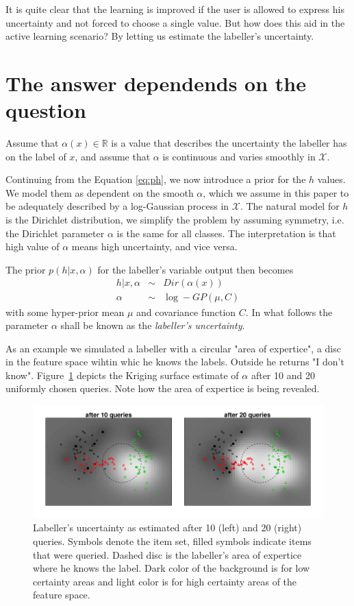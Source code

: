 \documentclass[10pt, onecolumn]{article}
\newcommand{\R}{\mathbb{R}}
\newcommand{\X}{\mathcal{X}}
\begin{document}
It is quite clear that the learning is improved if the user is allowed to express his uncertainty and not forced to choose a single value. But how does this aid in the active learning scenario? By letting us estimate the labeller's uncertainty.


\section{The answer dependends on the question}
Assume that $\alpha(x)\in \R$ is a value that describes the uncertainty the labeller has on the label of $x$, and assume that $\alpha$ is continuous and varies smoothly in $\X$.

Continuing from the Equation \ref{eq:ph}, we now introduce a prior for the $h$ values. We model them as dependent on the smooth $\alpha$, which we assume in this paper to be adequately described by a log-Gaussian process in $\X$. The natural model for $h$ is the Dirichlet distribution, we simplify the problem by assuming symmetry, i.e. the Dirichlet parameter $\alpha$ is the same for all classes. The interpretation is that high value of $\alpha$ means high uncertainty, and vice versa. 

The prior $p(h|x,\alpha)$ for the labeller's variable output then becomes
\begin{eqnarray}
h | x, \alpha &\sim& Dir(\alpha(x))\\
\alpha &\sim & \log - GP(\mu, C)
\end{eqnarray}
with some hyper-prior mean $\mu$ and covariance function $C$. In what follows the parameter $\alpha$ shall be known as the \emph{labeller's uncertainty}. 


As an example we simulated a labeller with a circular "area of expertice", a disc in the feature space wihtin whic he knows the labels. Outside he returns "I don't know". Figure~\ref{fig:est_alpha1} depicts the Kriging surface estimate of $\alpha$ after 10 and 20 uniformly chosen queries. Note how the area of expertice is being revealed.

\begin{figure}[hbtp]
\centering
\includegraphics[width=6in]{figures/estimated_alpha.pdf}
\caption{Labeller's uncertainty as estimated after 10 (left) and 20 (right) queries. Symbols denote the item set, filled symbols indicate items that were queried. Dashed disc is the labeller's area of expertice where he knows the label. Dark color of the background is for low certainty areas and light color is for high certainty areas of the feature space.}
\label{fig:est_alpha1}
\end{figure}
\end{document}
